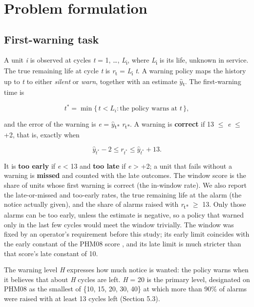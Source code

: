 \documentclass[a4paper,fleqn,doubleblind]{cas-dc}
\begin{document}
\section{Problem formulation}\label{sec:3}

\subsection{First-warning task}

A unit \textit{i} is observed at cycles \textit{t} = 1, \ldots{}, \textit{L}\textsubscript{i}, where \textit{L}\textsubscript{i} is its life, unknown in service. The true remaining life at cycle \textit{t} is \textit{r}\textsubscript{t} = \textit{L}\textsubscript{i} \textminus{} \textit{t}. A warning policy maps the history up to \textit{t} to either \textit{silent} or \textit{warn}, together with an estimate $\hat{y}$\textsubscript{t}. The first-warning time is

\begin{equation}
t^{*} = \min\{\, t < L_i : \text{the policy warns at } t \,\},
\end{equation}

and the error of the warning is \textit{e} = $\hat{y}$\textsubscript{t*} \textminus{} \textit{r}\textsubscript{t*}. A warning is \textbf{correct} if \textminus{}13 $\le$ \textit{e} $\le$ +2, that is, exactly when

\begin{equation}
\hat{y}_{t^*} - 2 \le r_{t^*} \le \hat{y}_{t^*} + 13.
\end{equation}

It is \textbf{too early} if \textit{e} < \textminus{}13 and \textbf{too late} if \textit{e} > +2; a unit that fails without a warning is \textbf{missed} and counted with the late outcomes. The window score is the share of units whose first warning is correct (the in-window rate). We also report the late-or-missed and too-early rates, the true remaining life at the alarm (the notice actually given), and the share of alarms raised with \textit{r}\textsubscript{t*} $\ge$ 13. Only those alarms can be too early, unless the estimate is negative, so a policy that warned only in the last few cycles would meet the window trivially. The window was fixed by an operator's requirement before this study; its early limit coincides with the early constant of the PHM08 score \cite{saxena2008}, and its late limit is much stricter than that score's late constant of 10.

The warning level \textit{H} expresses how much notice is wanted: the policy warns when it believes that about \textit{H} cycles are left. \textit{H} = 20 is the primary level, designated on PHM08 as the smallest of \{10, 15, 20, 30, 40\} at which more than 90\% of alarms were raised with at least 13 cycles left (Section 5.3).
\end{document}

